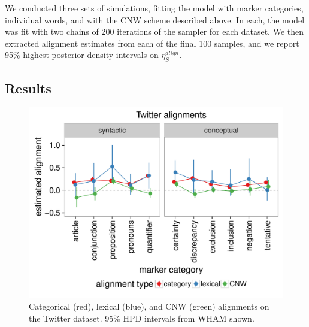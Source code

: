 \documentclass[11pt]{article}
\begin{document}
We conducted three sets of simulations, fitting the model with marker categories, individual words, and with the CNW scheme described above.
In each, the model was fit with two chains of 200 iterations of the sampler for each dataset.  We then extracted alignment estimates from each of the final 100 samples, and we report 95\% highest posterior density intervals on  $\eta^{align}_S$. %

\subsection{Results}

\begin{figure}[t]
  \begin{center}
    \includegraphics[width=\columnwidth]{results/twitter_line.pdf}
  \end{center}
  \caption{Categorical (red), lexical (blue), and CNW (green) alignments on the Twitter dataset. 95\% HPD intervals from WHAM shown.}\label{fig:twitter-res}
\end{figure}
\end{document}

